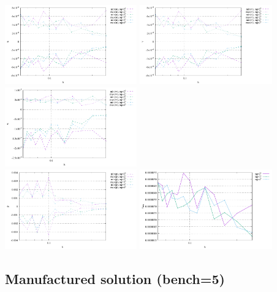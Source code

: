 \begin{center}
\includegraphics[width=5.7cm]{python_codes/fieldstone_82/RESULTS/bench4/u.pdf}
\includegraphics[width=5.7cm]{python_codes/fieldstone_82/RESULTS/bench4/v.pdf}
\includegraphics[width=5.7cm]{python_codes/fieldstone_82/RESULTS/bench4/w.pdf}\\
\includegraphics[width=5.7cm]{python_codes/fieldstone_82/RESULTS/bench4/p.pdf}
\includegraphics[width=5.7cm]{python_codes/fieldstone_82/RESULTS/bench4/vrms.pdf}
\end{center}






\newpage
\subsection*{Manufactured solution (bench=5)}

